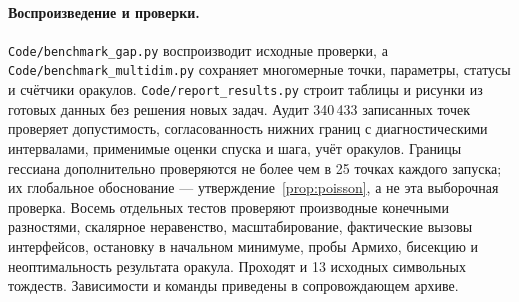 \paragraph{Воспроизведение и проверки.}
\texttt{Code/benchmark\_gap.py} воспроизводит исходные проверки,
а \texttt{Code/benchmark\_multidim.py} сохраняет многомерные точки,
параметры, статусы и счётчики оракулов.
\texttt{Code/report\_results.py} строит таблицы и рисунки из готовых
данных без решения новых задач. Аудит 340\,433 записанных точек
проверяет допустимость, согласованность нижних границ с диагностическими
интервалами, применимые оценки спуска и шага, учёт оракулов.
Границы гессиана дополнительно проверяются не более чем в 25 точках
каждого запуска; их глобальное обоснование --- утверждение~\ref{prop:poisson},
а не эта выборочная проверка.
Восемь отдельных тестов проверяют производные конечными разностями,
скалярное неравенство, масштабирование, фактические вызовы интерфейсов,
остановку в начальном минимуме, пробы Армихо, бисекцию и неоптимальность
результата оракула. Проходят и 13 исходных символьных тождеств.
Зависимости и команды приведены в сопровождающем архиве.
